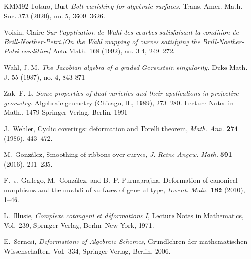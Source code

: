 \documentclass[11pt,twoside]{amsart}
\theoremstyle{plain}
\numberwithin{equation}{section}
\theoremstyle{definition}
\begin{document}
\begin{thebibliography}{KMM92}
Totaro, Burt
\emph{Bott vanishing for algebraic surfaces.}
Trans. Amer. Math. Soc. 373 (2020), no. 5, 3609–3626.




Voisin, Claire
\emph{Sur l'application de Wahl des courbes satisfaisant la condition de Brill-Noether-Petri.[On the Wahl mapping of curves satisfying the Brill-Noether-Petri condition]}
Acta Math. 168 (1992), no. 3-4, 249–272.






Wahl, J. M. 
\emph{The Jacobian algebra of a graded Gorenstein singularity.}
Duke Math. J. 55 (1987), no. 4,
843-871

Zak, F. L.
\emph{Some properties of dual varieties and their applications in projective geometry.}
Algebraic geometry (Chicago, IL, 1989), 273–280.
Lecture Notes in Math., 1479
Springer-Verlag, Berlin, 1991

J.~Wehler,
\newblock Cyclic coverings: deformation and Torelli theorem,
\newblock \emph{Math. Ann.} \textbf{274} (1986), 443--472.

M.~Gonz\'alez,
\newblock Smoothing of ribbons over curves,
\newblock \emph{J. Reine Angew. Math.} \textbf{591} (2006), 201--235.

F.~J. Gallego, M.~Gonz\'alez, and B.~P. Purnaprajna,
\newblock Deformation of canonical morphisms and the moduli of surfaces of general type,
\newblock \emph{Invent. Math.} \textbf{182} (2010), 1--46.

L.~Illusie,
\newblock \emph{Complexe cotangent et d\'eformations I},
\newblock Lecture Notes in Mathematics, Vol.~239,
\newblock Springer-Verlag, Berlin--New York, 1971.

E.~Sernesi,
\newblock \emph{Deformations of Algebraic Schemes},
\newblock Grundlehren der mathematischen Wissenschaften, Vol.~334,
\newblock Springer-Verlag, Berlin, 2006.




 
\end{thebibliography}
\end{document}
